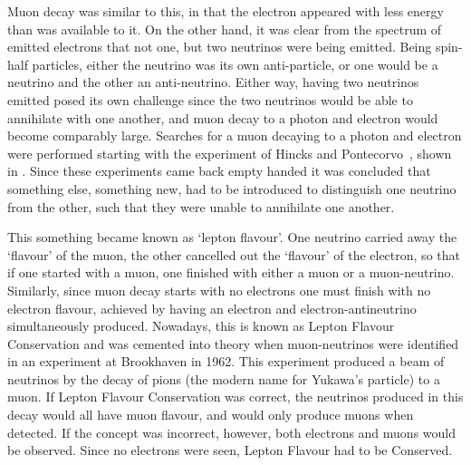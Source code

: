 
Muon decay was similar to this, in that the electron appeared with less energy than was available to it.
On the other hand, it was clear from the spectrum of emitted electrons that not one, but two neutrinos were being emitted.
Being spin-half particles, either the neutrino was its own anti-particle, or one would be a neutrino and the other an anti-neutrino.
Either way, having two neutrinos emitted posed its own challenge since the two neutrinos would be able to annihilate with one another, and muon decay to a photon and electron would become comparably large.
Searches for a muon decaying to a photon and electron were performed starting with the experiment of Hincks and Pontecorvo~\cite{Hincks194802}, shown in .
Since these experiments came back empty handed it was concluded that something else, something new, had to be introduced to distinguish one neutrino from the other, such that they were unable to annihilate one another.
\FigTheoryHincksPontecorvoMuEGamma

This something became known as 	`lepton flavour'.  
One neutrino carried away the `flavour' of the muon, the other cancelled out the `flavour' of the electron, so that if one started with a muon, one finished with either a muon or a muon-neutrino.
Similarly, since muon decay starts with no electrons one must finish with no electron flavour, achieved by having an electron and electron-antineutrino simultaneously produced.
Nowadays, this is known as Lepton Flavour Conservation and was cemented into theory when muon-neutrinos were identified in an experiment at Brookhaven in 1962.
This experiment produced a beam of neutrinos by the decay of pions (the modern name for Yukawa's particle) to a muon.
If Lepton Flavour Conservation was correct, the neutrinos produced in this decay would all have muon flavour, and would only produce muons when detected.
If the concept was incorrect, however, both electrons and muons would be observed.
Since no electrons were seen, Lepton Flavour had to be Conserved.

